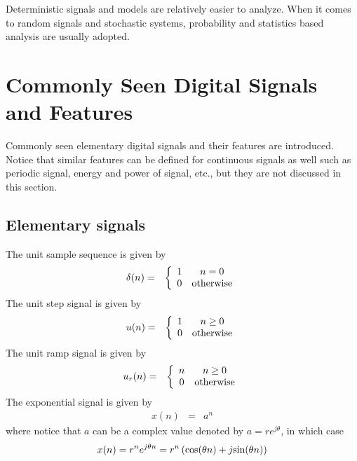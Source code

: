 Deterministic signals and models are relatively easier to analyze. When it comes to random signals and stochastic systems, probability and statistics based analysis are usually adopted.

\section{Commonly Seen Digital Signals and Features}

Commonly seen elementary digital signals and their features are introduced. Notice that similar features can be defined for continuous signals as well such as periodic signal, energy and power of signal, etc., but they are not discussed in this section.

\subsection{Elementary signals}

The unit sample sequence is given by
\begin{eqnarray}
	\delta(n) &=& \left\{\begin{array}{cc}
		1 & n = 0 \\
		0 & \textup{otherwise}
	\end{array}\right. \nonumber
\end{eqnarray}
The unit step signal is given by
\begin{eqnarray}
	u(n) &=& \left\{\begin{array}{cc}
		1 & n \geq 0 \\
		0 & \textup{otherwise}
	\end{array}\right. \nonumber
\end{eqnarray}
The unit ramp signal is given by 
\begin{eqnarray}
	u_r(n) &=& \left\{\begin{array}{cc}
		n & n \geq 0 \\
		0 & \textup{otherwise}
	\end{array}\right. \nonumber
\end{eqnarray}
The exponential signal is given by
\begin{eqnarray}
	x(n) &=& a^n \nonumber
\end{eqnarray}
where notice that $a$ can be a complex value denoted by $a=re^{j\theta}$, in which case
\begin{eqnarray}
	x(n) = r^ne^{j\theta n} = r^n\left(\textup{cos}(\theta n) + j\textup{sin}(\theta n)\right) \nonumber
\end{eqnarray}

